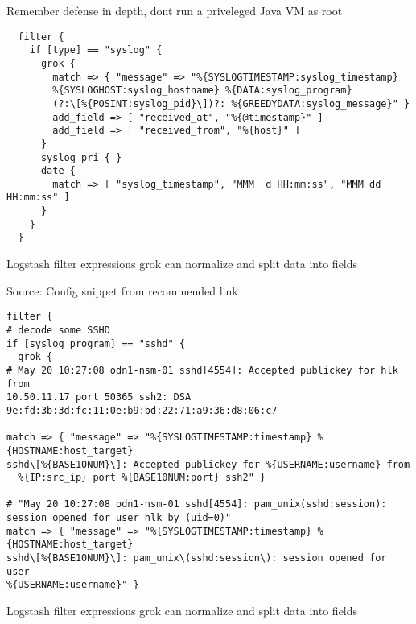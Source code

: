 \documentclass[20pt,landscape,a4paper,footrule]{foils}
\begin{document}
Remember defense in depth, dont run a priveleged Java VM as root \smiley


{\footnotesize
\begin{verbatim}
  filter {
    if [type] == "syslog" {
      grok {
        match => { "message" => "%{SYSLOGTIMESTAMP:syslog_timestamp}
        %{SYSLOGHOST:syslog_hostname} %{DATA:syslog_program}
        (?:\[%{POSINT:syslog_pid}\])?: %{GREEDYDATA:syslog_message}" }
        add_field => [ "received_at", "%{@timestamp}" ]
        add_field => [ "received_from", "%{host}" ]
      }
      syslog_pri { }
      date {
        match => [ "syslog_timestamp", "MMM  d HH:mm:ss", "MMM dd HH:mm:ss" ]
      }
    }
  }
\end{verbatim}
}

\begin{list2}
\item Logstash filter expressions grok can normalize and split data into fields
\end{list2}

Source:
Config snippet from recommended link\\
{\small{}}



{\footnotesize
\begin{verbatim}
filter {
# decode some SSHD
if [syslog_program] == "sshd" {
  grok {
# May 20 10:27:08 odn1-nsm-01 sshd[4554]: Accepted publickey for hlk from
10.50.11.17 port 50365 ssh2: DSA 9e:fd:3b:3d:fc:11:0e:b9:bd:22:71:a9:36:d8:06:c7

match => { "message" => "%{SYSLOGTIMESTAMP:timestamp} %{HOSTNAME:host_target}
sshd\[%{BASE10NUM}\]: Accepted publickey for %{USERNAME:username} from
  %{IP:src_ip} port %{BASE10NUM:port} ssh2" }

# "May 20 10:27:08 odn1-nsm-01 sshd[4554]: pam_unix(sshd:session):
session opened for user hlk by (uid=0)"
match => { "message" => "%{SYSLOGTIMESTAMP:timestamp} %{HOSTNAME:host_target}
sshd\[%{BASE10NUM}\]: pam_unix\(sshd:session\): session opened for user
%{USERNAME:username}" }
\end{verbatim}
}

\begin{list2}
\item Logstash filter expressions grok can normalize and split data into fields
\end{list2}
\end{document}
